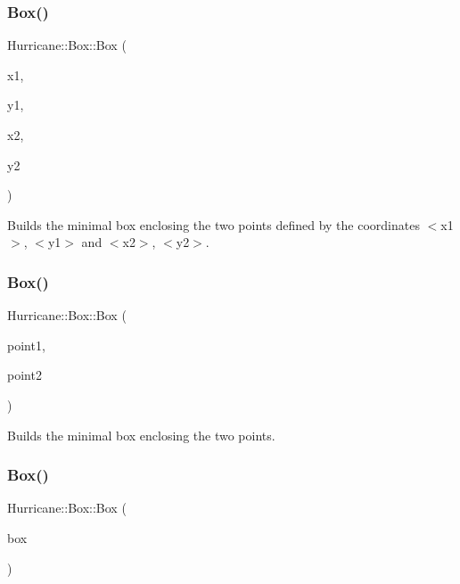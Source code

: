 \subsubsection{\texorpdfstring{Box()}{Box()}\hspace{0.1cm}{\footnotesize\ttfamily [4/6]}}
{\footnotesize\ttfamily Hurricane\+::\+Box\+::\+Box (\begin{DoxyParamCaption}\item[{const \hyperlink{group__DbUGroup_ga4fbfa3e8c89347af76c9628ea06c4146}{Db\+U\+::\+Unit} \&}]{x1,  }\item[{const \hyperlink{group__DbUGroup_ga4fbfa3e8c89347af76c9628ea06c4146}{Db\+U\+::\+Unit} \&}]{y1,  }\item[{const \hyperlink{group__DbUGroup_ga4fbfa3e8c89347af76c9628ea06c4146}{Db\+U\+::\+Unit} \&}]{x2,  }\item[{const \hyperlink{group__DbUGroup_ga4fbfa3e8c89347af76c9628ea06c4146}{Db\+U\+::\+Unit} \&}]{y2 }\end{DoxyParamCaption})}

Builds the minimal box enclosing the two points defined by the coordinates {\ttfamily $<$x1$>$}, {\ttfamily $<$y1$>$} and {\ttfamily $<$x2$>$}, {\ttfamily $<$y2$>$}. \mbox{\label{classHurricane_1_1Box_a47f434b4dbda6af14a354722f66a47da}} 
\subsubsection{\texorpdfstring{Box()}{Box()}\hspace{0.1cm}{\footnotesize\ttfamily [5/6]}}
{\footnotesize\ttfamily Hurricane\+::\+Box\+::\+Box (\begin{DoxyParamCaption}\item[{const \hyperlink{classHurricane_1_1Point}{Point} \&}]{point1,  }\item[{const \hyperlink{classHurricane_1_1Point}{Point} \&}]{point2 }\end{DoxyParamCaption})}

Builds the minimal box enclosing the two points. \mbox{\label{classHurricane_1_1Box_af9a7605270bf1ebb38723fba5b9d9236}} 
\subsubsection{\texorpdfstring{Box()}{Box()}\hspace{0.1cm}{\footnotesize\ttfamily [6/6]}}
{\footnotesize\ttfamily Hurricane\+::\+Box\+::\+Box (\begin{DoxyParamCaption}\item[{const \hyperlink{classHurricane_1_1Box}{Box} \&}]{box }\end{DoxyParamCaption})}

